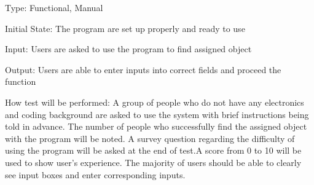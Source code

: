 \documentclass[12pt, titlepage]{article}
\begin{document}
\begin{enumerate}
Type: Functional, Manual
					
Initial State: The program are set up properly and ready to use
					
Input: Users are asked to use the program to find assigned object
					
Output: Users are able to enter inputs into correct fields and proceed the function
					
How test will be performed: A group of people who do not have any electronics and coding background are asked to use the system with brief instructions being told in advance. The number of people who successfully find the assigned object with the program will be noted. A survey question regarding the difficulty of using the program will be asked at the end of test.A score from 0 to 10 will be used to show user's experience. The majority of users should be able to clearly see input boxes and enter corresponding inputs.


\end{enumerate}
\end{document}
